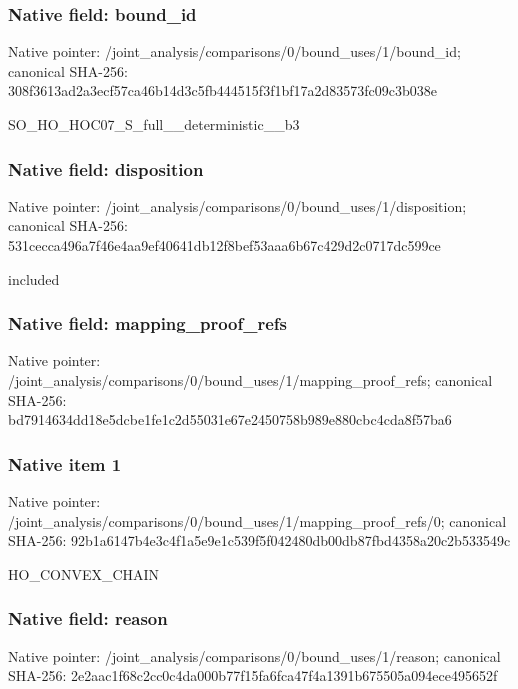 \documentclass[10pt,a4paper]{article}
\begin{document}
\subsubsection{Native field: bound\_\allowbreak{}id}
Native pointer: /joint\_\allowbreak{}analysis/comparisons/0/bound\_\allowbreak{}uses/1/bound\_\allowbreak{}id; canonical SHA-256: 308f3613ad2a3ecf57ca46b14d3c5fb444515f3f1bf17a2d83573fc09c3b038e

\begingroup\raggedright\sloppy SO\_\allowbreak{}HO\_\allowbreak{}HOC07\_\allowbreak{}S\_\allowbreak{}full\_\allowbreak{}\_\allowbreak{}deterministic\_\allowbreak{}\_\allowbreak{}b3\par\endgroup

\subsubsection{Native field: disposition}
Native pointer: /joint\_\allowbreak{}analysis/comparisons/0/bound\_\allowbreak{}uses/1/disposition; canonical SHA-256: 531cecca496a7f46e4aa9ef40641db12f8bef53aaa6b67c429d2c0717dc599ce

\begingroup\raggedright\sloppy included\par\endgroup

\subsubsection{Native field: mapping\_\allowbreak{}proof\_\allowbreak{}refs}
Native pointer: /joint\_\allowbreak{}analysis/comparisons/0/bound\_\allowbreak{}uses/1/mapping\_\allowbreak{}proof\_\allowbreak{}refs; canonical SHA-256: bd7914634dd18e5dcbe1fe1c2d55031e67e2450758b989e880cbc4cda8f57ba6

\subsubsection{Native item 1}
Native pointer: /joint\_\allowbreak{}analysis/comparisons/0/bound\_\allowbreak{}uses/1/mapping\_\allowbreak{}proof\_\allowbreak{}refs/0; canonical SHA-256: 92b1a6147b4e3c4f1a5e9e1c539f5f042480db00db87fbd4358a20c2b533549c

\begingroup\raggedright\sloppy HO\_\allowbreak{}CONVEX\_\allowbreak{}CHAIN\par\endgroup

\subsubsection{Native field: reason}
Native pointer: /joint\_\allowbreak{}analysis/comparisons/0/bound\_\allowbreak{}uses/1/reason; canonical SHA-256: 2e2aac1f68c2cc0c4da000b77f15fa6fca47f4a1391b675505a094ece495652f
\end{document}
